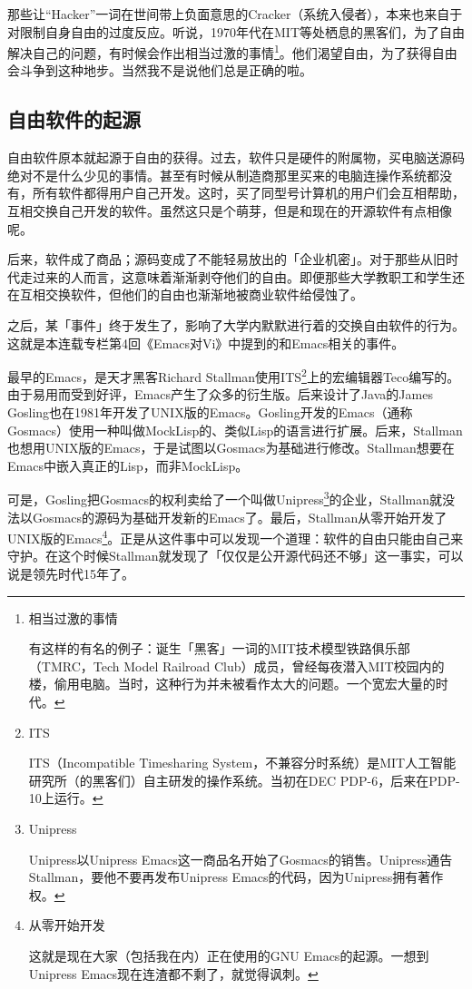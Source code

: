 \documentclass[a4paper,12pt]{article}
\begin{document}
那些让“Hacker”一词在世间带上负面意思的Cracker（系统入侵者），本来也来自于对限制自身自由的过度反应。听说，1970年代在MIT等处栖息的黑客们，为了自由解决自己的问题，有时候会作出相当过激的事情\footnote{相当过激的事情

有这样的有名的例子：诞生「黑客」一词的MIT技术模型铁路俱乐部（TMRC，Tech Model Railroad Club）成员，曾经每夜潜入MIT校园内的楼，偷用电脑。当时，这种行为并未被看作太大的问题。一个宽宏大量的时代。}。他们渴望自由，为了获得自由会斗争到这种地步。当然我不是说他们总是正确的啦。

\subsection{自由软件的起源}

自由软件原本就起源于自由的获得。过去，软件只是硬件的附属物，买电脑送源码绝对不是什么少见的事情。甚至有时候从制造商那里买来的电脑连操作系统都没有，所有软件都得用户自己开发。这时，买了同型号计算机的用户们会互相帮助，互相交换自己开发的软件。虽然这只是个萌芽，但是和现在的开源软件有点相像呢。

后来，软件成了商品；源码变成了不能轻易放出的「企业机密」。对于那些从旧时代走过来的人而言，这意味着渐渐剥夺他们的自由。即便那些大学教职工和学生还在互相交换软件，但他们的自由也渐渐地被商业软件给侵蚀了。

之后，某「事件」终于发生了，影响了大学内默默进行着的交换自由软件的行为。这就是本连载专栏第4回《Emacs对Vi》中提到的和Emacs相关的事件。

最早的Emacs，是天才黑客Richard Stallman使用ITS\footnote{ITS

ITS（Incompatible Timesharing System，不兼容分时系统）是MIT人工智能研究所（的黑客们）自主研发的操作系统。当初在DEC PDP-6，后来在PDP-10上运行。}上的宏编辑器Teco编写的。由于易用而受到好评，Emacs产生了众多的衍生版。后来设计了Java的James Gosling也在1981年开发了UNIX版的Emacs。Gosling开发的Emacs（通称Gosmacs）使用一种叫做MockLisp的、类似Lisp的语言进行扩展。后来，Stallman也想用UNIX版的Emacs，于是试图以Gosmacs为基础进行修改。Stallman想要在Emacs中嵌入真正的Lisp，而非MockLisp。

可是，Gosling把Gosmacs的权利卖给了一个叫做Unipress\footnote{Unipress

  Unipress以Unipress Emacs这一商品名开始了Gosmacs的销售。Unipress通告Stallman，要他不要再发布Unipress Emacs的代码，因为Unipress拥有著作权。}的企业，Stallman就没法以Gosmacs的源码为基础开发新的Emacs了。最后，Stallman从零开始开发了UNIX版的Emacs\footnote{从零开始开发

  这就是现在大家（包括我在内）正在使用的GNU Emacs的起源。一想到Unipress Emacs现在连渣都不剩了，就觉得讽刺。}。正是从这件事中可以发现一个道理：软件的自由只能由自己来守护。在这个时候Stallman就发现了「仅仅是公开源代码还不够」这一事实，可以说是领先时代15年了。
\end{document}
